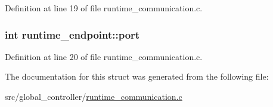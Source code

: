 Definition at line 19 of file runtime\-\_\-communication.\-c.

\hypertarget{structruntime__endpoint_a9b80d9b279d096c6f7c6628e60665c00}{
\subsubsection[{port}]{\setlength{\rightskip}{0pt plus 5cm}int runtime\-\_\-endpoint\-::port}}\label{structruntime__endpoint_a9b80d9b279d096c6f7c6628e60665c00}


Definition at line 20 of file runtime\-\_\-communication.\-c.



The documentation for this struct was generated from the following file\-:\begin{DoxyCompactItemize}
\item 
src/global\-\_\-controller/\hyperlink{global__controller_2runtime__communication_8c}{runtime\-\_\-communication.\-c}\end{DoxyCompactItemize}
